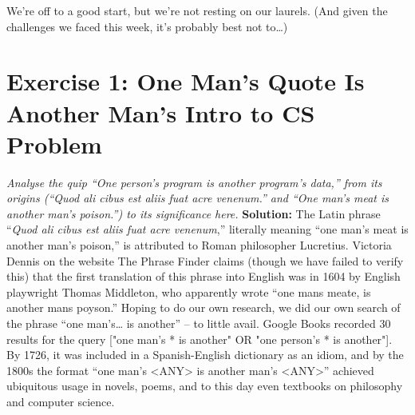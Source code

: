 \documentclass{article}
\begin{document}
We’re off to a good start, but we’re not resting on our laurels. (And given the challenges we faced this week, it’s probably best not to…)


\newpage


\section{Exercise 1: One Man's Quote Is Another Man's Intro to CS Problem}


\textit{Analyse the quip “One person’s program is another program’s data,” from its origins (“Quod ali cibus est aliis fuat acre venenum.” and “One man’s meat is another man’s poison.”) to its significance here.} \linebreak \linebreak
\noindent \textbf{Solution:} \linebreak \linebreak
The Latin phrase “\textit{Quod ali cibus est aliis fuat acre venenum},” literally meaning “one man’s meat is another man’s poison,” is attributed to Roman philosopher Lucretius. Victoria Dennis on the website The Phrase Finder\citep{phrasefinder} claims (though we have failed to verify this) that the first translation of this phrase into English was in 1604 by English playwright Thomas Middleton, who apparently wrote “one mans meate, is another mans poyson.” \linebreak \linebreak
Hoping to do our own research, we did our own search of the phrase “one man’s… is another” – to little avail. Google Books recorded 30 results for the query ["one man's * is another" OR "one person's * is another"]. By 1726, it was included in a Spanish-English dictionary as an idiom,\citep{dict} and by the 1800s the format “one man’s <ANY> is another man’s <ANY>” achieved ubiquitous usage in novels, poems, and to this day even textbooks on philosophy and computer science.
\end{document}
